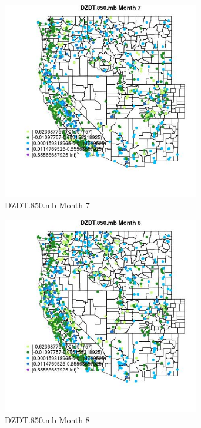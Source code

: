 \begin{figure} 
\centering  
\includegraphics[width=0.77\textwidth]{Code_Outputs/Report_ML_input_PM25_Step4_part_f_de_duplicated_aveswNAs_MapObsMo7DZDT850mb.jpg} 
\caption{\label{fig:Report_ML_input_PM25_Step4_part_f_de_duplicated_aveswNAsMapObsMo7DZDT850mb}DZDT.850.mb Month 7} 
\end{figure} 
 

\clearpage 

\begin{figure} 
\centering  
\includegraphics[width=0.77\textwidth]{Code_Outputs/Report_ML_input_PM25_Step4_part_f_de_duplicated_aveswNAs_MapObsMo8DZDT850mb.jpg} 
\caption{\label{fig:Report_ML_input_PM25_Step4_part_f_de_duplicated_aveswNAsMapObsMo8DZDT850mb}DZDT.850.mb Month 8} 
\end{figure} 
 

